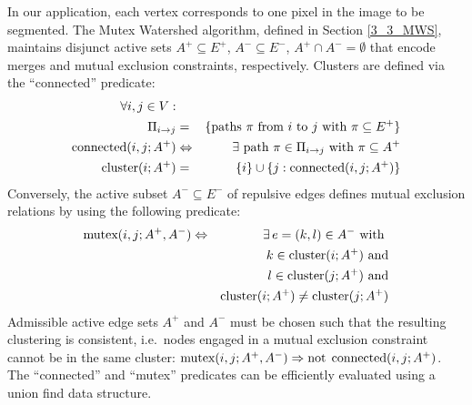 In our application, each vertex corresponds to one pixel in the image to be segmented. 
The Mutex Watershed algorithm, defined in Section \ref{3_3_MWS}, maintains disjunct active sets $A^+ \subseteq E^+$, $A^- \subseteq E^-$, $A^+ \cap A^- = \emptyset$ that encode merges and mutual exclusion constraints, respectively. Clusters are defined via the ``connected'' predicate: %
\begin{eqnarray*}
\forall i,j\in V:\\
\Pi_{i \rightarrow j} & = & \{ \text{paths } \pi\text{ from }i\text{ to }j\text{ with }\pi\subseteq E^+\}\\
\textrm{connected}(i, j; A^+)&\Leftrightarrow& \exists \text{ path } \pi \in \Pi_{i \rightarrow j} \text{ with }\pi \subseteq A^+ \\
\textrm{cluster}(i; A^+) & = & \{i\} \cup \{j: \textrm{connected}(i,j; A^+) \}
\end{eqnarray*}
Conversely, the active subset $A^-\subseteq E^-$ of repulsive edges defines mutual exclusion relations by using the following predicate: %
\begin{eqnarray*}
\textrm{mutex}(i, j; A^+, A^-)&\Leftrightarrow& \exists \, e=(k,l)\in A^- \text{ with } \\ && k \in \textrm{cluster}(i; A^+) \text{ and}\\
& & l \in \textrm{cluster}(j; A^+) \text{ and} \\
&&\textrm{cluster}(i; A^+) \neq \textrm{cluster}(j; A^+)
\end{eqnarray*}
Admissible active edge sets $A^+$ and $A^-$ must be chosen such that the resulting clustering is consistent, i.e.\ nodes engaged in a mutual exclusion constraint cannot be in the same cluster:
$\textrm{mutex}(i,j; A^+, A^-) \Rightarrow \textrm{not} \:\: \textrm{connected}(i, j; A^+)$.
The ``connected'' and ``mutex'' predicates can be efficiently evaluated using a union find data structure.

